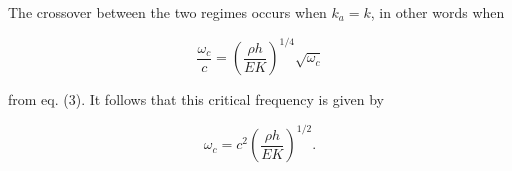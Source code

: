   The crossover between the two regimes occurs when $k_a = k$, in other words 
  when 

  $$\frac{\omega_c}{c} = \left( \dfrac{\rho h}{EK} \right)^{1/4} 
  \sqrt{\omega_c} \tag{8}$$ 

  from eq. (3). It follows that this critical frequency is given by 

  $$\omega_c = c^2 \left( \dfrac{\rho h}{EK} \right)^{1/2} . \tag{9}$$ 